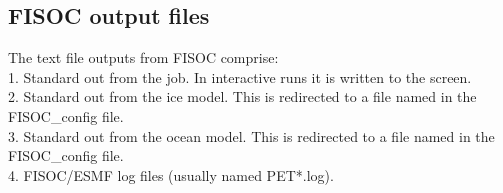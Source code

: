 \documentclass[11pt]{article}
\begin{document}






\subsection{FISOC output files}
\label{sec:output}

The text file  outputs from FISOC comprise: \\
1. Standard out from the job.  In interactive runs it is written to the screen. \\
2. Standard out from the ice model.  This is redirected to a file named in the FISOC\_config file. \\
3. Standard out from the ocean model.  This is redirected to a file named in the FISOC\_config file. \\
4. FISOC/ESMF log files (usually named PET*.log). 
\end{document}
